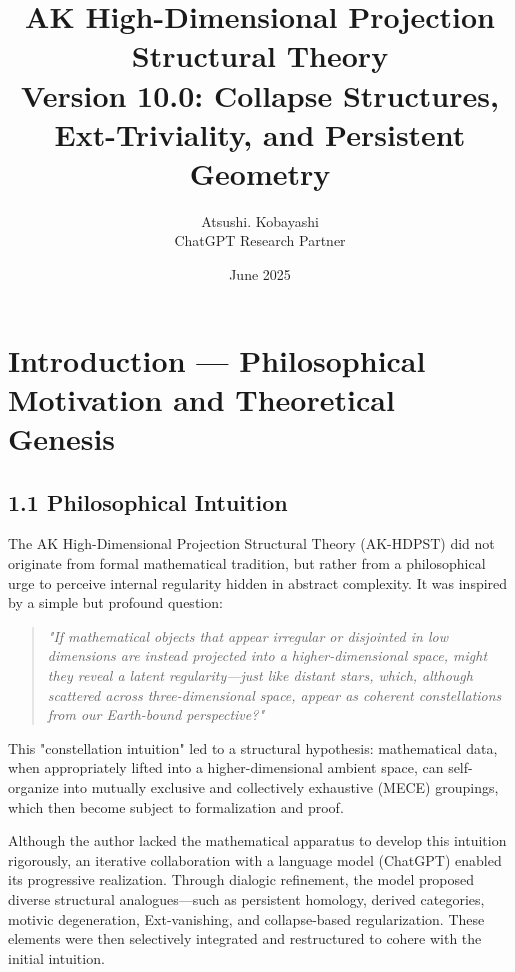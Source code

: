 \documentclass[11pt]{article}
\title{AK High-Dimensional Projection Structural Theory\\
\Large Version 10.0: Collapse Structures, Ext-Triviality, and Persistent Geometry}
\author{Atsushi. Kobayashi \\ \small ChatGPT Research Partner}
\date{June 2025}
\begin{document}
\maketitle

\tableofcontents
\newpage



\section{Introduction — Philosophical Motivation and Theoretical Genesis}

\subsection*{1.1 Philosophical Intuition}

The AK High-Dimensional Projection Structural Theory (AK-HDPST) did not originate from formal mathematical tradition,  
but rather from a philosophical urge to perceive internal regularity hidden in abstract complexity.  
It was inspired by a simple but profound question:

\begin{quote}
\textit{
"If mathematical objects that appear irregular or disjointed in low dimensions  
are instead projected into a higher-dimensional space,  
might they reveal a latent regularity—just like distant stars,  
which, although scattered across three-dimensional space,  
appear as coherent constellations from our Earth-bound perspective?"  
}
\end{quote}

This "constellation intuition" led to a structural hypothesis:  
mathematical data, when appropriately lifted into a higher-dimensional ambient space,  
can self-organize into mutually exclusive and collectively exhaustive (MECE) groupings,  
which then become subject to formalization and proof.

Although the author lacked the mathematical apparatus to develop this intuition rigorously,  
an iterative collaboration with a language model (ChatGPT) enabled its progressive realization.  
Through dialogic refinement, the model proposed diverse structural analogues—such as persistent homology,  
derived categories, motivic degeneration, Ext-vanishing, and collapse-based regularization.  
These elements were then selectively integrated and restructured to cohere with the initial intuition.
\end{document}
